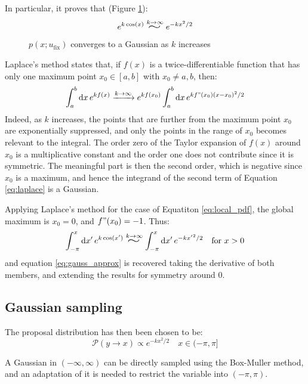 In particular, it proves that (Figure \ref{fig:gauss}):
\begin{equation}\label{eq:gauss_approx}
    e^{k\cos(x)} \stackrel{k\to\infty}{\scalebox{2}[1.25]{$\sim$}} e^{-kx^2/2}
\end{equation}

\begin{figure}[!htb]
    \centering
    
    \caption{$p(x;u_\mathrm{fix})$ converges to a Gaussian as $k$ increases}
    \label{fig:gauss}
\end{figure}

Laplace's method states that, if $f(x)$ is a twice-differentiable function that has only one maximum point $x_0 \in [a,b]$ with $x_0 \neq a,b$,
then:
\begin{equation}\label{eq:laplace}
	\int_a^b\mathrm dx\,e^{kf(x)} \xrightarrow{k\to\infty} e^{kf(x_0)}\int_a^b\mathrm dx\,e^{kf"(x_0)(x-x_0)^2/2}
\end{equation}
Indeed, as $k$ increases, the points that are further from the maximum point $x_0$ are exponentially suppressed,
and only the points in the range of $x_0$ becomes relevant to the integral.
The order zero of the Taylor expansion of $f(x)$ around $x_0$ is a multiplicative constant and the order one does not contribute since it is symmetric.
The meaningful part is then the second order, which is negative since $x_0$ is a maximum,
and hence the integrand of the second term of Equation \eqref{eq:laplace} is a Gaussian.

Applying Laplace's method for the case of Equatiton \eqref{eq:local_pdf},
the global maximum is $x_0=0$, and $f"(x_0) = -1$.
Thus:
\[
    \int_{-\pi}^x\mathrm dx'\,e^{k\cos(x')} \stackrel{k\to\infty}{\scalebox{2}[1.25]{$\sim$}} \int_{-\pi}^x\mathrm dx'\,e^{-k{x'}^2/2} \quad \mathrm{for}\ x>0
\]
and equation \eqref{eq:gauss_approx} is recovered taking the derivative of both members, and extending the results for symmetry around $0$.

\subsection*{Gaussian sampling}
The proposal distribution has then been chosen to be:
\begin{equation}\label{eq:gauss_proposal}
    \mathcal P(y\to x) \propto e^{-kx^2/2} \quad x \in (-\pi,\pi]
\end{equation}

A Gaussian in $(-\infty,\infty)$ can be directly sampled using the Box-Muller method,
and an adaptation of it is needed to restrict the variable into $(-\pi,\pi)$.

